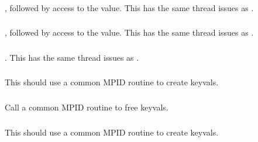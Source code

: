 \documentclass{article}
\begin{document}
\subsubsection{}
\begin{adi3}, followed by access to the value.
This has the same thread issues as .
\end{adi3}

\subsubsection{}
\begin{adi3}, followed by access to the value.
This has the same thread issues as .
\end{adi3}

\subsubsection{}
\begin{adi3}.
This has the same thread issues as .
\end{adi3}

\subsubsection{}
This should use a common MPID routine to create keyvals.  

\subsubsection{}
Call a common MPID routine to free keyvals.

\subsubsection{}
This should use a common MPID routine to create keyvals.  
\end{document}
